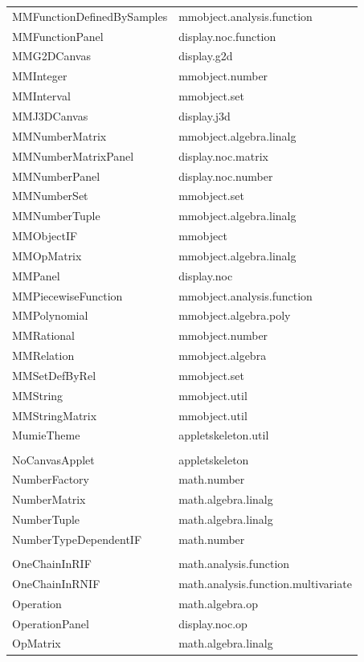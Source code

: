 \documentclass[a4paper,12pt]{book}
\begin{document}
\begin{appendix}
{\begin{longtable}{l | l}
    MMFunctionDefinedBySamples & mmobject.analysis.function\\
    MMFunctionPanel & display.noc.function\\
    MMG2DCanvas & display.g2d\\
    MMInteger & mmobject.number\\
    MMInterval & mmobject.set\\
    MMJ3DCanvas & display.j3d\\
    MMNumberMatrix & mmobject.algebra.linalg\\
    MMNumberMatrixPanel & display.noc.matrix\\
    MMNumberPanel & display.noc.number\\
    MMNumberSet & mmobject.set\\
    MMNumberTuple & mmobject.algebra.linalg\\
    MMObjectIF & mmobject\\
    MMOpMatrix & mmobject.algebra.linalg\\
    MMPanel & display.noc\\
    MMPiecewiseFunction & mmobject.analysis.function\\
    MMPolynomial & mmobject.algebra.poly\\
    MMRational & mmobject.number\\
    MMRelation & mmobject.algebra\\
    MMSetDefByRel & mmobject.set\\
    MMString & mmobject.util\\
    MMStringMatrix & mmobject.util\\
    MumieTheme & appletskeleton.util\\
    \\
    NoCanvasApplet & appletskeleton\\
    NumberFactory & math.number\\
    NumberMatrix & math.algebra.linalg\\
    NumberTuple & math.algebra.linalg\\
    NumberTypeDependentIF & math.number\\
    \\
    OneChainInRIF & math.analysis.function\\
    OneChainInRNIF & math.analysis.function.multivariate\\
    Operation & math.algebra.op\\
    OperationPanel & display.noc.op\\
    OpMatrix & math.algebra.linalg\\

\end{longtable}}
\end{appendix}
\end{document}
